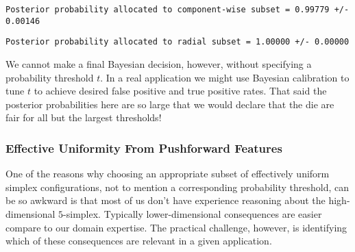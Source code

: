 \documentclass[
  letterpaper,
  DIV=11,
  numbers=noendperiod]{scrartcl}
\newenvironment{Shaded}{\begin{snugshade}}{\end{snugshade}}
\newcommand{\ControlFlowTok}[1]{\textcolor[rgb]{0.00,0.23,0.31}{#1}}
\newcommand{\DecValTok}[1]{\textcolor[rgb]{0.68,0.00,0.00}{#1}}
\newcommand{\FunctionTok}[1]{\textcolor[rgb]{0.28,0.35,0.67}{#1}}
\newcommand{\NormalTok}[1]{\textcolor[rgb]{0.00,0.23,0.31}{#1}}
\newcommand{\OtherTok}[1]{\textcolor[rgb]{0.00,0.23,0.31}{#1}}
\newcommand{\SpecialCharTok}[1]{\textcolor[rgb]{0.37,0.37,0.37}{#1}}
\newcommand{\StringTok}[1]{\textcolor[rgb]{0.13,0.47,0.30}{#1}}
\begin{document}
\begin{verbatim}
Posterior probability allocated to component-wise subset = 0.99779 +/- 0.00146
\end{verbatim}

\begin{Shaded}
\end{Shaded}

\begin{verbatim}
Posterior probability allocated to radial subset = 1.00000 +/- 0.00000
\end{verbatim}

We cannot make a final Bayesian decision, however, without specifying a
probability threshold \(t\). In a real application we might use Bayesian
calibration to tune \(t\) to achieve desired false positive and true
positive rates. That said the posterior probabilities here are so large
that we would declare that the die are fair for all but the largest
thresholds!

\subsubsection{Effective Uniformity From Pushforward
Features}\label{sec:effective_pushforward}

One of the reasons why choosing an appropriate subset of effectively
uniform simplex configurations, not to mention a corresponding
probability threshold, can be so awkward is that most of us don't have
experience reasoning about the high-dimensional \(5\)-simplex. Typically
lower-dimensional consequences are easier compare to our domain
expertise. The practical challenge, however, is identifying which of
these consequences are relevant in a given application.
\end{document}
